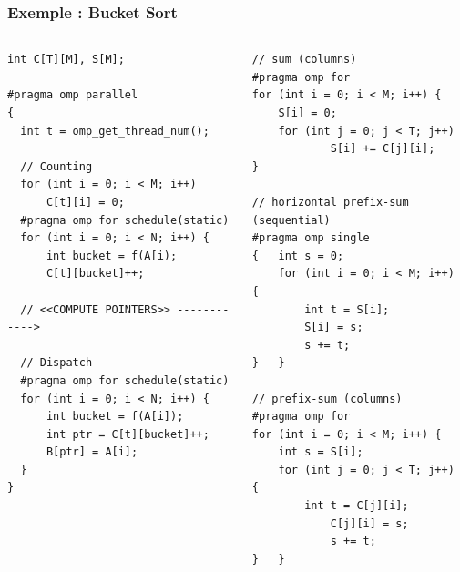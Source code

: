 \documentclass[xcolor={x11names,svgnames},x11names,svgnames]{beamer}
\begin{document}
\begin{frame}[label=radix_noconflict_table]
  \end{frame}


\begin{frame}[label=radix_code, fragile]
  \frametitle{Exemple : Bucket Sort}

  \begin{columns}
    \begin{column}{0.5\textwidth}
\begin{verbatim}
int C[T][M], S[M];

#pragma omp parallel
{
  int t = omp_get_thread_num();

  // Counting
  for (int i = 0; i < M; i++)
      C[t][i] = 0;
  #pragma omp for schedule(static)
  for (int i = 0; i < N; i++) {
      int bucket = f(A[i);
      C[t][bucket]++;

  // <<COMPUTE POINTERS>> ------------>

  // Dispatch
  #pragma omp for schedule(static)
  for (int i = 0; i < N; i++) {
      int bucket = f(A[i]);
      int ptr = C[t][bucket]++;
      B[ptr] = A[i];
  }
}
\end{verbatim}
    \end{column}  

    \begin{column}{5.8cm}
      \vspace{-0.7cm}
      \begin{verbatim}
// sum (columns)
#pragma omp for
for (int i = 0; i < M; i++) {
    S[i] = 0;
    for (int j = 0; j < T; j++)
            S[i] += C[j][i];
}

// horizontal prefix-sum (sequential)
#pragma omp single
{   int s = 0;
    for (int i = 0; i < M; i++) {
        int t = S[i];
        S[i] = s;
        s += t;
}   }

// prefix-sum (columns)
#pragma omp for
for (int i = 0; i < M; i++) {
    int s = S[i];
    for (int j = 0; j < T; j++) {
        int t = C[j][i];
            C[j][i] = s;
            s += t;
}   }
\end{verbatim}
    \end{column}
  \end{columns}
\end{frame}
\end{document}

